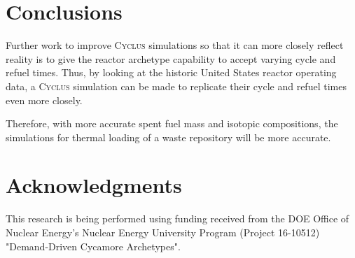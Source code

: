 \documentclass{anstrans}
\newcommand{\Cyclus}{\textsc{Cyclus}\xspace}%
\begin{document}
\section{Conclusions}
Further work to improve \Cyclus simulations so that it can more closely reflect reality is to give the reactor archetype capability to accept varying cycle and refuel times. Thus, by looking at the historic United States reactor operating data, a \Cyclus simulation can be made to replicate their cycle and refuel times even more closely. 

Therefore, with more accurate spent fuel mass and isotopic compositions, the simulations for thermal loading of a waste repository will be more accurate. 
\section{Acknowledgments}
This research is being performed using funding received from the DOE Office of Nuclear Energy's
Nuclear Energy University Program (Project 16-10512) "Demand-Driven Cycamore Archetypes". 



\end{document}
